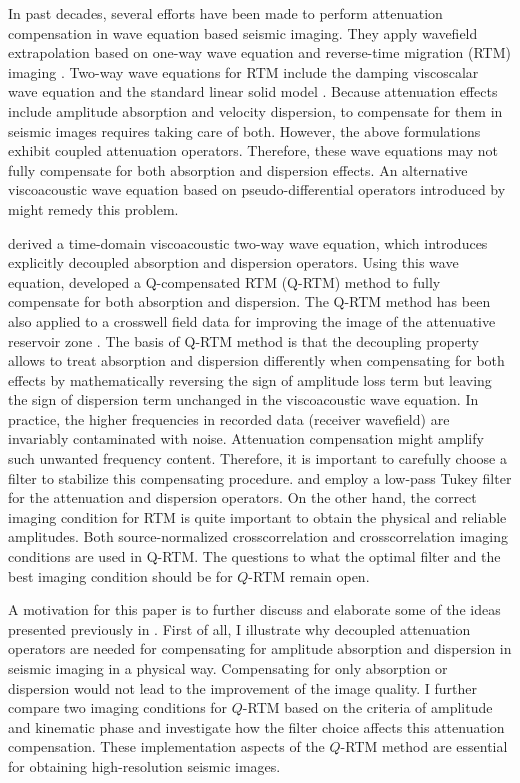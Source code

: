 In past decades, several efforts have been made to perform attenuation compensation in wave equation based seismic imaging. They apply wavefield extrapolation based on one-way wave equation \citep{Mittet1995, Zhang2002, Mittet2007} and reverse-time migration (RTM) imaging \citep{Fletcher2012}. Two-way wave equations for RTM include the damping viscoscalar wave equation \citep{Deng2007} and the standard linear solid model \citep{Deng2008}. Because attenuation effects include amplitude absorption and velocity dispersion, to compensate for them in seismic images requires taking care of both. However, the above formulations exhibit coupled attenuation operators. Therefore, these wave equations may not fully compensate for both absorption and dispersion effects. An alternative viscoacoustic wave equation based on pseudo-differential operators introduced by \citet[]{Zhang2010} might remedy this problem. 

\citet[]{zhu14a} derived a time-domain viscoacoustic two-way wave equation, which introduces explicitly decoupled absorption and dispersion operators. Using this wave equation, \citet[]{zhu14d} developed a Q-compensated RTM (Q-RTM) method to fully compensate for both absorption and dispersion. The Q-RTM method has been also applied to a crosswell field data for improving the image of the attenuative reservoir zone \cite[]{zhu15b}. The basis of Q-RTM method is that the decoupling property allows to treat absorption and dispersion differently when compensating for both effects by mathematically reversing the sign of amplitude loss term but leaving the sign of dispersion term unchanged in the viscoacoustic wave equation. 
In practice, the higher frequencies in recorded data (receiver wavefield) are invariably contaminated with noise. Attenuation compensation might amplify such unwanted frequency content. Therefore, it is important to carefully choose a filter to stabilize this compensating procedure. \citet[]{zhu14b} and \citet[]{zhu14d} employ a low-pass Tukey filter for the attenuation and dispersion operators. On the other hand, the correct imaging condition for RTM is quite important to obtain the physical and reliable amplitudes. Both source-normalized crosscorrelation \citep{zhu14b} and crosscorrelation imaging conditions \citep{zhu14d} are used in Q-RTM. The questions to what the optimal filter and the best imaging condition should be for $Q$-RTM remain open.

A motivation for this paper is to further discuss and elaborate some of the ideas presented previously in \citet[]{zhu14d}. First of all, I illustrate why decoupled attenuation operators are needed for compensating for amplitude absorption and dispersion in seismic imaging in a physical way. Compensating for only absorption or dispersion would not lead to the improvement of the image quality. I further compare two imaging conditions for $Q$-RTM based on the criteria of amplitude and kinematic phase and investigate how the filter choice affects this attenuation compensation. These implementation aspects of the $Q$-RTM method are essential for obtaining high-resolution seismic images. 

